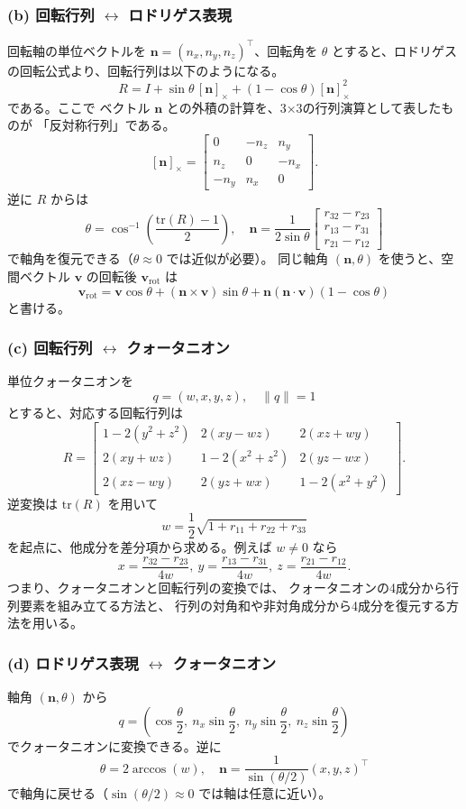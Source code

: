 ﻿\documentclass[11pt,a4paper]{ltjsarticle}
\begin{document}
\subsubsection*{(b) 回転行列 $\leftrightarrow$ ロドリゲス表現}
回転軸の単位ベクトルを $\mathbf{n}=(n_x,n_y,n_z)^\top$、回転角を $\theta$ とすると、ロドリゲスの回転公式より、回転行列は以下のようになる。
\[
R = I + \sin\theta\,[\mathbf{n}]_\times + (1-\cos\theta)[\mathbf{n}]_\times^2
\]
である。ここで
ベクトル $\mathbf{n}$ との外積の計算を、3×3の行列演算として表したものが
「反対称行列」である。
\[
[\mathbf{n}]_\times=
\begin{bmatrix}
0 & -n_z & n_y\\
n_z & 0 & -n_x\\
-n_y & n_x & 0
\end{bmatrix}.
\]
逆に $R$ からは
\[
\theta=\cos^{-1}\!\left(\frac{\mathrm{tr}(R)-1}{2}\right),\quad
\mathbf{n}=\frac{1}{2\sin\theta}
\begin{bmatrix}
r_{32}-r_{23}\\
r_{13}-r_{31}\\
r_{21}-r_{12}
\end{bmatrix}
\]
で軸角を復元できる（$\theta\approx 0$ では近似が必要）。
同じ軸角 $(\mathbf{n},\theta)$ を使うと、空間ベクトル $\mathbf{v}$ の回転後
$\mathbf{v}_{\mathrm{rot}}$ は
\[
\mathbf{v}_{\mathrm{rot}}
= \mathbf{v}\cos\theta
+ (\mathbf{n}\times\mathbf{v})\sin\theta
+ \mathbf{n}(\mathbf{n}\cdot\mathbf{v})(1-\cos\theta)
\]
と書ける。
\subsubsection*{(c) 回転行列 $\leftrightarrow$ クォータニオン}
単位クォータニオンを
\[
q=(w,x,y,z),\quad \|q\|=1
\]
とすると、対応する回転行列は
\[
R=
\begin{bmatrix}
1-2(y^2+z^2) & 2(xy-wz) & 2(xz+wy)\\
2(xy+wz) & 1-2(x^2+z^2) & 2(yz-wx)\\
2(xz-wy) & 2(yz+wx) & 1-2(x^2+y^2)
\end{bmatrix}.
\]
逆変換は $\mathrm{tr}(R)$ を用いて
\[
w=\frac{1}{2}\sqrt{1+r_{11}+r_{22}+r_{33}}
\]
を起点に、他成分を差分項から求める。例えば $w\neq 0$ なら
\[
x=\frac{r_{32}-r_{23}}{4w},\ 
y=\frac{r_{13}-r_{31}}{4w},\ 
z=\frac{r_{21}-r_{12}}{4w}.
\]
つまり、クォータニオンと回転行列の変換では、
クォータニオンの4成分から行列要素を組み立てる方法と、
行列の対角和や非対角成分から4成分を復元する方法を用いる。

\subsubsection*{(d) ロドリゲス表現 $\leftrightarrow$ クォータニオン}
軸角 $(\mathbf{n},\theta)$ から
\[
q=
\left(\cos\frac{\theta}{2},\ 
n_x\sin\frac{\theta}{2},\ 
n_y\sin\frac{\theta}{2},\ 
n_z\sin\frac{\theta}{2}\right)
\]
でクォータニオンに変換できる。逆に
\[
\theta=2\arccos(w),\quad
\mathbf{n}=\frac{1}{\sin(\theta/2)}(x,y,z)^\top
\]
で軸角に戻せる（$\sin(\theta/2)\approx 0$ では軸は任意に近い）。
\end{document}
